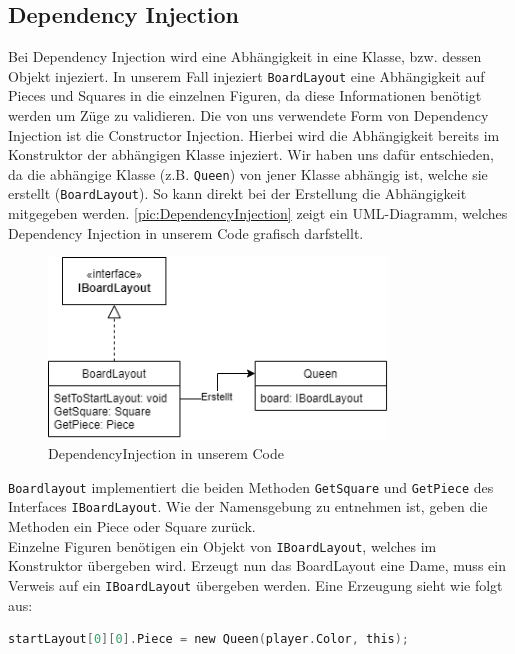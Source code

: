 \documentclass[
10pt, %
a4paper, %
oneside, %
headinclude,footinclude, %
BCOR5mm, %
]{scrartcl}
\begin{document}
\begin{onehalfspace}
\subsection{Dependency Injection}
\label{sec:depInjec}
Bei Dependency Injection wird eine Abhängigkeit in eine Klasse, bzw. dessen Objekt injeziert. In unserem Fall injeziert \texttt{BoardLayout} eine Abhängigkeit auf Pieces und Squares in die einzelnen Figuren, da diese Informationen benötigt werden um Züge zu validieren. Die von uns verwendete Form von Dependency Injection ist die Constructor Injection. Hierbei wird die Abhängigkeit bereits im Konstruktor der abhängigen Klasse injeziert. Wir haben uns dafür entschieden, da die abhängige Klasse (z.B. \texttt{Queen}) von jener Klasse abhängig ist, welche sie erstellt (\texttt{BoardLayout}). So kann direkt bei der Erstellung die Abhängigkeit mitgegeben werden. \autoref{pic:DependencyInjection} zeigt ein UML-Diagramm, welches Dependency Injection in unserem Code grafisch darfstellt.

\begin{figure}[h]
	\begin{center}
		\includegraphics[width=9cm]{DependencyInjection.png}
		\caption{\label{pic:DependencyInjection}DependencyInjection in unserem Code}
	\end{center}
\end{figure}

\texttt{Boardlayout} implementiert die beiden Methoden \texttt{GetSquare} und \texttt{GetPiece} des Interfaces \texttt{IBoardLayout}. Wie der Namensgebung zu entnehmen ist, geben die Methoden ein Piece oder Square zurück. \\
Einzelne Figuren benötigen ein Objekt von \texttt{IBoardLayout}, welches im Konstruktor übergeben wird. Erzeugt nun das BoardLayout eine Dame, muss ein Verweis auf ein \texttt{IBoardLayout} übergeben werden. Eine Erzeugung sieht wie folgt aus:

\begin{lstlisting}[language=c, style=mStyle]
startLayout[0][0].Piece = new Queen(player.Color, this);
\end{lstlisting}


\end{onehalfspace}
\end{document}
